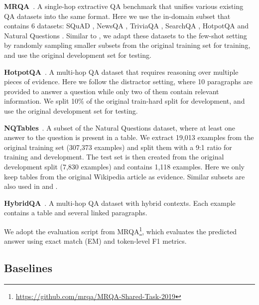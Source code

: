 \documentclass[11pt]{article}
\newcommand{\revise}[1]{#1}
\newcommand{\nop}[1]{}
\newcommand{\ours}[0]{\text{ReasonBERT}}
\begin{document}
\noindent\textbf{MRQA}~\cite{fisch-etal-2019-mrqa}. A single-hop extractive QA benchmark that unifies various existing QA datasets into the same format. Here we use the in-domain subset that contains 6 datasets: SQuAD \cite{rajpurkar-etal-2016-squad}, NewsQA \cite{trischler-etal-2017-newsqa}, TriviaQA \cite{joshi-etal-2017-triviaqa}, SearchQA \cite{Dunn2017SearchQAAN}, HotpotQA \cite{yang-etal-2018-hotpotqa} and Natural Questions \cite{kwiatkowski-etal-2019-natural}. Similar to \citet{ram2021fewshot}, we adapt these datasets to the few-shot setting by randomly sampling smaller subsets from the original training set for training, and use the original development set for testing.\nop{Do we need to say something about comparing with pre-training methods like REALM somewhere? I don't think it is necessary to compare with them given that they have different focuses.}

\noindent\textbf{HotpotQA}~\cite{yang-etal-2018-hotpotqa}. A multi-hop QA dataset that requires reasoning over multiple pieces of evidence. Here we follow the distractor setting{, where 10 paragraphs are provided to answer a question while only two of them contain relevant information}. We split 10\% of the original train-hard split for development, and use the original development set for testing.

\noindent\textbf{NQTables}~\cite{kwiatkowski-etal-2019-natural}. A subset of the Natural Questions dataset, where at least one answer to the question is present in a table. We extract 19,013 examples from the original training set (307,373 examples) and split them with a 9:1 ratio for training and development. The test set is then created from the original development split (7,830 examples) and contains 1,118 examples. Here we only keep tables from the original Wikipedia article as evidence. Similar subsets are also used in \citet{herzig2021open} and \citet{zayats2021representations}.

\noindent\textbf{HybridQA}~\cite{chen-etal-2020-hybridqa}. A multi-hop QA dataset with hybrid contexts. Each example contains a table and several linked paragraphs.\nop{ where it is necessary to jointly reason over the tabular and textual evidence to answer a question.}

\revise{We adopt the evaluation script from MRQA\footnote{\url{https://github.com/mrqa/MRQA-Shared-Task-2019}}, which evaluates the predicted answer using exact match (EM) and token-level F1 metrics.}
\subsection{Baselines}
\nop{We conduct a comprehensive comparison of \ours\ with existing pre-training methods.}
\end{document}
